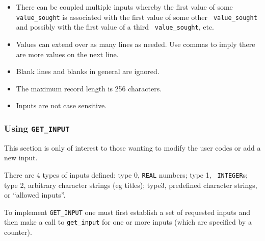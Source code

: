 \documentclass[12pt,twoside]{article}  %
\begin{document}
\begin{itemize}
\item There can be coupled multiple inputs whereby the first value of some
{\tt value\_sought} is associated with the first value of some other {\tt
value\_sought} and possibly with the first value of a third {\tt
value\_sought}, etc.

\item Values can extend over as many lines as needed. Use commas to imply
there are more values on the next line.

\item Blank lines and blanks in general are ignored.

\item The maximum record length is 256 characters.

\item Inputs are not case sensitive.

\end{itemize}

\subsubsection{Using {\tt GET\_INPUT}}

This section is only of interest to those wanting to modify the user codes
or add a new input.

There are 4 types of inputs defined: type 0, {\tt REAL} numbers; type 1, {\tt
INTEGER}s; type 2,  arbitrary character strings (eg
titles); type3, predefined
character strings, or ``allowed inputs''.

To implement \verb+GET_INPUT+ one must first establish a set of requested
inputs and then make a call to {\tt get\_input} for one or more inputs
(which are specified by a counter).
\end{document}
